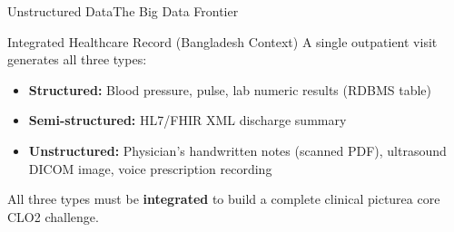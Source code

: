 \documentclass[aspectratio=169,10pt]{beamer}
\begin{document}
\begin{frame}{Unstructured Data\textemdash The Big Data Frontier}

      \begin{exampleblock}{Integrated Healthcare Record (Bangladesh Context)}
        A single outpatient visit generates all three types:
        \vspace{4pt}
        \begin{itemize}
          \small
          \item \textbf{Structured:} Blood pressure, pulse, lab numeric results (RDBMS table)
          \item \textbf{Semi-structured:} HL7/FHIR XML discharge summary
          \item \textbf{Unstructured:} Physician's handwritten notes (scanned PDF), ultrasound DICOM image, voice prescription recording
        \end{itemize}
        \vspace{4pt}
        All three types must be \textbf{integrated} to build a complete clinical picture\textemdash a core CLO2 challenge.
      \end{exampleblock}
\end{frame}
\end{document}
